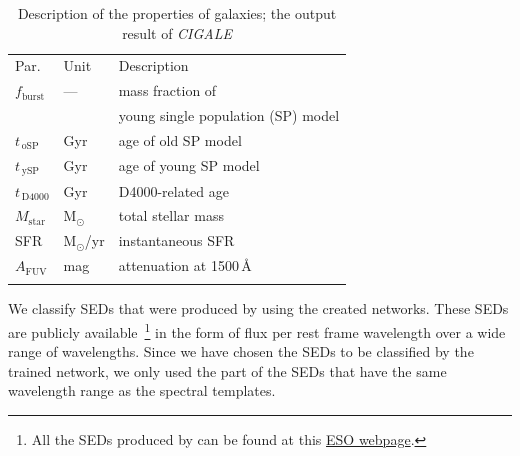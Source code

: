        
\begin{table}
\caption[Description of the properties of \citet{Hossein12} galaxies]{Description of the properties of \citet{Hossein12} galaxies; the output result of {\em CIGALE}}     
\label{tab: props}
\centering
\begin{tabular}{l l l}
\hline\hline
\noalign{\smallskip}
Par. & Unit & Description\\
\noalign{\smallskip}
\hline
\noalign{\smallskip}
$f_\mathrm{burst}$ & --- & mass fraction of \\
& & young single population (SP) model \\
\noalign{\smallskip}
$t_{\,\mathrm{oSP}}$ & Gyr & age of old SP model \\
$t_{\,\mathrm{ySP}}$ & Gyr & age of young SP model \\
$t_{\,\mathrm{D4000}}$ & Gyr & D4000-related age \\
\noalign{\smallskip}
$M_\mathrm{star}$ & M$_\odot$ & total stellar mass  \\
SFR & M$_\odot$/yr & instantaneous SFR  \\
$A_\mathrm{FUV}$ & mag & attenuation at 1500\,\AA{} \\
\noalign{\smallskip}
\hline
\end{tabular}
\end{table}

    We classify SEDs that were produced by  using the created networks.
    These SEDs are publicly available~\footnote{All the SEDs produced by   can be found at this \href{http://telbib.eso.org/detail.php?bibcode=2012AJ....144..172T}{ESO webpage}.} in the form of flux per rest frame wavelength over a wide range of wavelengths.
    Since we have chosen the  SEDs to be classified by the trained network, we only used the part of the SEDs that have the same wavelength range as the  spectral templates.  